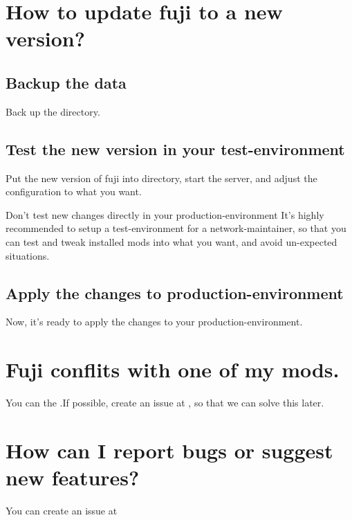 \section{How to update fuji to a new version?}

\subsection{Backup the data}
Back up the  directory.

\subsection{Test the new version in your test-environment}
Put the new version of fuji into  directory, start the server, and adjust the configuration to what you want.

\begin{warn}{Don't test new changes directly in your production-environment}
    It's highly recommended to setup a test-environment for a network-maintainer, so that you can test and tweak installed mods into what you want, and avoid un-expected situations.
\end{warn}

\subsection{Apply the changes to production-environment}
Now, it's ready to apply the changes to your production-environment.


\section{Fuji conflits with one of my mods.}
You can  the .If possible, create an issue at \issueurl, so that we can solve this later.


\section{How can I report bugs or suggest new features?}
You can create an issue at \issueurl



